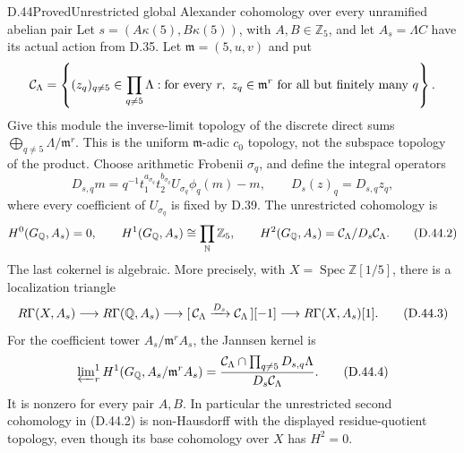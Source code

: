 \begin{statement}{D.44}{Proved}{Unrestricted global Alexander cohomology over every unramified abelian pair}
Let \(s=(A\kappa(5),B\kappa(5))\), with
\(A,B\in\mathbb Z_5\), and let \(A_s=\Lambda C\)
have its actual action from D.35.
Let \(\mathfrak m=(5,u,v)\) and put
\[
 {\cal C}_\Lambda=
 \left\{(z_q)_{q\ne5}\in\prod_{q\ne5}\Lambda:
  \text{for every }r,\ z_q\in\mathfrak m^r
                     \text{ for all but finitely many }q\right\}.
\]
Give this module the inverse-limit topology of the
discrete direct sums
\(\bigoplus_{q\ne5}\Lambda/\mathfrak m^r\).
This is the uniform \(\mathfrak m\)-adic \(c_0\)
topology, not the subspace topology of the product.
Choose arithmetic Frobenii \(\sigma_q\), and define
the integral operators
\[
 D_{s,q}m=q^{-1}t_1^{a_{\sigma_q}}t_2^{b_{\sigma_q}}
       U_{\sigma_q}\phi_q(m)-m,\qquad
 D_s(z)_q=D_{s,q}z_q,                                   \tag{D.44.1}
\]
where every coefficient of \(U_{\sigma_q}\) is fixed
by D.39. The unrestricted cohomology is
\[
 H^0(G_{\mathbb Q},A_s)=0,\qquad
 H^1(G_{\mathbb Q},A_s)\cong\prod_{\mathbb N}\mathbb Z_5,
 \qquad
 H^2(G_{\mathbb Q},A_s)
              ={\cal C}_\Lambda/D_s{\cal C}_\Lambda.     \tag{D.44.2}
\]
The last cokernel is algebraic. More precisely,
with \(X=\operatorname{Spec}\mathbb Z[1/5]\),
there is a localization triangle
\[
 R\Gamma(X,A_s)\longrightarrow
 R\Gamma(\mathbb Q,A_s)\longrightarrow
 [\,{\cal C}_\Lambda\xrightarrow{D_s}{\cal C}_\Lambda\,][-1]
 \longrightarrow R\Gamma(X,A_s)[1].                     \tag{D.44.3}
\]
For the coefficient tower \(A_s/\mathfrak m^rA_s\),
the Jannsen kernel is
\[
 \varprojlim\nolimits^1_r
       H^1(G_{\mathbb Q},A_s/\mathfrak m^rA_s)
 =
 \frac{{\cal C}_\Lambda\cap\prod_{q\ne5}D_{s,q}\Lambda}
      {D_s{\cal C}_\Lambda}.                            \tag{D.44.4}
\]
It is nonzero for every pair \(A,B\). In particular the
unrestricted second cohomology in (D.44.2) is
non-Hausdorff with the displayed residue-quotient
topology, even though its base cohomology over
\(X\) has \(H^2=0\).
\end{statement}
